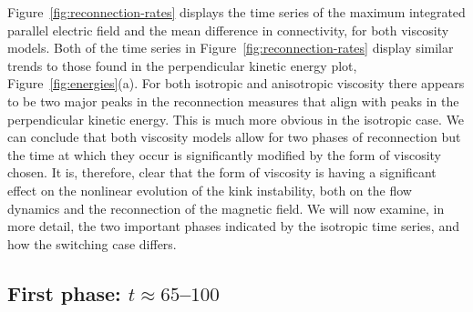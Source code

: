 Figure~\ref{fig:reconnection-rates} displays the time series of the maximum integrated parallel electric field and the mean difference in connectivity, for both viscosity models. Both of the time series in Figure~\ref{fig:reconnection-rates} display similar trends to those found in the perpendicular kinetic energy plot, Figure~\ref{fig:energies}(a). For both isotropic and anisotropic viscosity there appears to be two major peaks in the reconnection measures that align with peaks in the perpendicular kinetic energy. This is much more obvious in the isotropic case. We can conclude that both viscosity models allow for two phases of reconnection but the time at which they occur is significantly modified by the form of viscosity chosen. It is, therefore, clear that the form of viscosity is having a significant effect on the nonlinear evolution of the kink instability, both on the flow dynamics and the reconnection of the magnetic field. We will now examine, in more detail, the two important phases indicated by the isotropic time series, and how the switching case differs.

\subsection{First phase: $t\approx65$--$100$}


